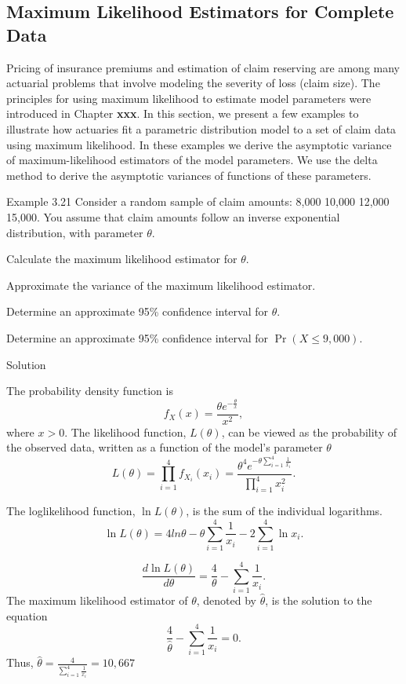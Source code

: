 \documentclass[]{book}
\begin{document}
\subsection{Maximum Likelihood Estimators for Complete
Data}\label{maximum-likelihood-estimators-for-complete-data}

Pricing of insurance premiums and estimation of claim reserving are
among many actuarial problems that involve modeling the severity of loss
(claim size). The principles for using maximum likelihood to estimate
model parameters were introduced in Chapter \textbf{xxx}. In this
section, we present a few examples to illustrate how actuaries fit a
parametric distribution model to a set of claim data using maximum
likelihood. In these examples we derive the asymptotic variance of
maximum-likelihood estimators of the model parameters. We use the delta
method to derive the asymptotic variances of functions of these
parameters.

Example 3.21 Consider a random sample of claim amounts: 8,000 10,000
12,000 15,000. You assume that claim amounts follow an inverse
exponential distribution, with parameter \(\theta\).

Calculate the maximum likelihood estimator for \(\theta\).

Approximate the variance of the maximum likelihood estimator.

Determine an approximate 95\% confidence interval for \(\theta\).

Determine an approximate 95\% confidence interval for
\(\Pr \left( X \leq 9,000 \right).\)

Solution

The probability density function is
\[f_{X}\left( x \right) = \frac{\theta e^{- \frac{\theta}{x}}}{x^{2}}, \]
where \(x > 0\). The likelihood function, \(L\left( \theta \right)\),
can be viewed as the probability of the observed data, written as a
function of the model's parameter \(\theta\)
\[L\left( \theta \right) = \prod_{i = 1}^{4}{f_{X_{i}}\left( x_{i} \right)} = \frac{\theta^{4}e^{- \theta\sum_{i = 1}^{4}\frac{1}{x_{i}}}}{\prod_{i = 1}^{4}x_{i}^{2}}.\]

The loglikelihood function, \(\ln L \left( \theta \right)\), is the sum
of the individual logarithms.
\[\ln L \left( \theta \right) = 4ln\theta - \theta\sum_{i = 1}^{4}\frac{1}{x_{i}} - 2\sum_{i = 1}^{4}\ln x_{i} .\]

\[\frac{d \ln L \left( \theta \right)}{d \theta} = \frac{4}{\theta} - \sum_{i = 1}^{4}\frac{1}{x_{i}}.\]
The maximum likelihood estimator of \(\theta\), denoted by
\(\hat{\theta}\), is the solution to the equation
\[\frac{4}{\hat{\theta}} - \sum_{i = 1}^{4}{\frac{1}{x_{i}} = 0}.\]
Thus,
\(\hat{\theta} = \frac{4}{\sum_{i = 1}^{4}\frac{1}{x_{i}}} = 10,667\)
\end{document}
